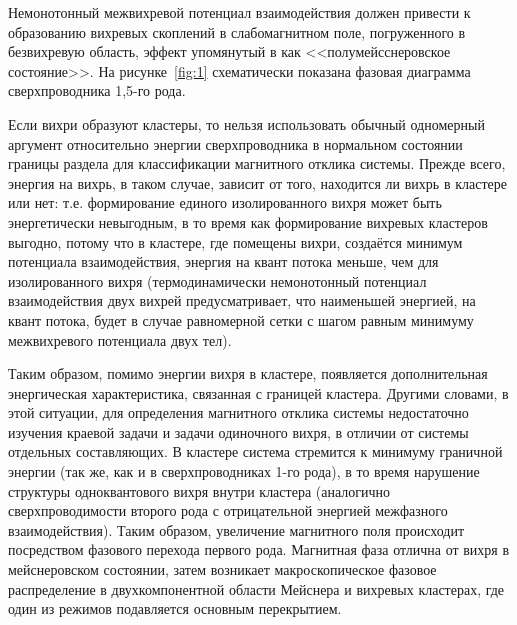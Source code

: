 Немонотонный межвихревой потенциал взаимодействия должен привести к 
образованию вихревых скоплений в слабомагнитном поле, погруженного в 
безвихревую область, эффект упомянутый в \cite{bib:1} как 
<<полумейсснеровское состояние>>. На рисунке~\ref{fig:1} схематически 
показана фазовая диаграмма сверхпроводника 1,5-го рода.

Если вихри образуют кластеры, то нельзя использовать обычный одномерный 
аргумент относительно энергии сверхпроводника в нормальном состоянии границы 
раздела для классификации магнитного отклика системы. Прежде всего, энергия 
на вихрь, в таком случае, зависит от того, находится ли вихрь в кластере или 
нет: т.е. формирование единого изолированного вихря может быть энергетически 
невыгодным, в то время как формирование вихревых кластеров выгодно, потому что 
в кластере, где помещены вихри, создаётся минимум потенциала взаимодействия, 
энергия на квант потока меньше, чем для изолированного вихря (термодинамически 
немонотонный потенциал взаимодействия двух вихрей предусматривает, что 
наименьшей энергией, на квант потока, будет в случае равномерной сетки с шагом 
равным минимуму межвихревого потенциала двух тел).

Таким образом, помимо энергии вихря в кластере, появляется дополнительная 
энергическая характеристика, связанная с границей кластера. Другими словами, в 
этой ситуации, для определения магнитного отклика системы недостаточно 
изучения краевой задачи и задачи одиночного вихря, в отличии от системы 
отдельных составляющих. В кластере система стремится к минимуму граничной 
энергии (так же, как и в сверхпроводниках 1-го рода), в то время нарушение 
структуры одноквантового вихря внутри кластера (аналогично сверхпроводимости 
второго рода с отрицательной энергией межфазного взаимодействия). Таким 
образом, увеличение магнитного поля происходит посредством фазового перехода 
первого рода. Магнитная фаза отлична от вихря в мейснеровском состоянии, затем 
возникает макроскопическое фазовое распределение в двухкомпонентной области 
Мейснера и вихревых кластерах, где один из режимов подавляется основным 
перекрытием. \cite{bib:main}

\newpage